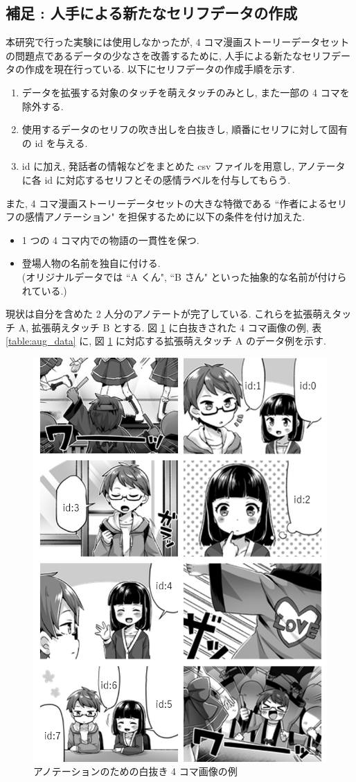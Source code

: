 \changeindent{0cm}
\subsection{補足 : 人手による新たなセリフデータの作成}
\changeindent{2cm}

本研究で行った実験には使用しなかったが, 4 コマ漫画ストーリーデータセットの問題点であるデータの少なさを改善するために, 人手による新たなセリフデータの作成を現在行っている. 以下にセリフデータの作成手順を示す.

\begin{enumerate}
  \item データを拡張する対象のタッチを萌えタッチのみとし, また一部の 4 コマを除外する.
  \item 使用するデータのセリフの吹き出しを白抜きし, 順番にセリフに対して固有の id を与える.
  \item id に加え, 発話者の情報などをまとめた csv ファイルを用意し, アノテータに各 id に対応するセリフとその感情ラベルを付与してもらう.
\end{enumerate}

また, 4 コマ漫画ストーリーデータセットの大きな特徴である ``作者によるセリフの感情アノテーション" を担保するために以下の条件を付け加えた.

\begin{itemize}
  \item 1 つの 4 コマ内での物語の一貫性を保つ.
  \item 登場人物の名前を独自に付ける. \\ (オリジナルデータでは ``A くん", ``B さん" といった抽象的な名前が付けられている.)
\end{itemize}

\newpage
現状は自分を含めた 2 人分のアノテートが完了している. これらを拡張萌えタッチ A, 拡張萌えタッチ B とする. 図 \ref{fig:shironuki} に白抜きされた 4 コマ画像の例, 表 \ref{table:aug_data} に, 図 \ref{fig:shironuki} に対応する拡張萌えタッチ A のデータ例を示す.

\begin{figure}[!h]
  \vspace{1mm}
  \centering
  \includegraphics[width=0.4\hsize]{doc/figures/shironuki.png}
  \caption{アノテーションのための白抜き 4 コマ画像の例}
  \label{fig:shironuki}
\end{figure}

